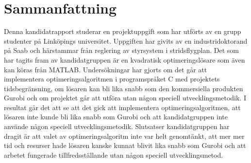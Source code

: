 \section*{Sammanfattning}
Denna kandidatrapport studerar en projektuppgift som har utförts av en grupp studenter på Linköpings universitet. Uppgiften har givits av en industridoktorand på Saab och härstammar från reglering av styrsystem i stridsflygplan. Det som har tagits fram av kandidatgruppen är en  kvadratisk optimeringslösare som även kan köras från MATLAB. Undersökningar har gjorts om det går att implementera optimeringsalgoritmen i programspråket C med projektets tidsbegränsning, om lösaren kan bli lika snabb som den kommersiella produkten Gurobi och om projektet går att utföra utan någon speciell utvecklingsmetodik. I resultat går det att se att det gick att implementera optimeringsalgoritmen, att lösaren inte kunde bli lika snabb som Gurobi och att kandidatgruppen inte använde någon speciell utvecklingsmetodik. Slutsatser kandidatgruppen har dragit är att valet av optimeringsalgoritm inte var helt genomtänkt, att mer mer tid och resurser hade lösaren kanske kunnat blivit lika snabb som Gurobi och att arbetet fungerade tillfredsställande utan någon speciell utvecklingsmetod.     